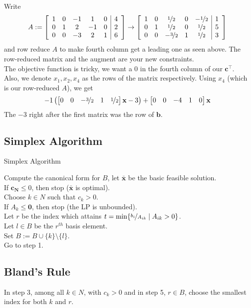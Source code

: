 Write
\[A:=
    \left[\begin{array}{ccccc|c}  
        1 & 0 & -1 & 1 & 0 & 4\\
        0 & 1 & 2 & -1 & 0 & 2\\
        0 & 0 & -3 & 2 & 1 & 6
       \end{array}\right]
    \rightarrow
    \left[\begin{array}{ccccc|c}
        1 & 0 & \nicefrac{1}{2} & 0 & -\nicefrac{1}{2} & 1\\
        0 & 1 & \nicefrac{1}{2} & 0 & \nicefrac{1}{2} & 5\\
        0 & 0 & -\nicefrac{3}{2} & 1 & \nicefrac{1}{2} & 3
    \end{array}\right]
\]
and row reduce $A$ to make fourth column get a leading one as seen above.
The row-reduced matrix and the augment are your new constraints.\\
The objective function is tricky, we want a 0 in the fourth column of our $\mathbf{c}^\top $.
Also, we denote $x_1,x_2,x_4$ as the rows of the matrix respectively.
Using $x_4$ (which is our row-reduced $A$), we get
\[-1\left(
    \begin{bmatrix}
        0 & 0 & -\nicefrac{3}{2} & 1 & \nicefrac{1}{2}
    \end{bmatrix}\mathbf{x}-3\right)+
    \begin{bmatrix}
        0 & 0 & -4 & 1 & 0
    \end{bmatrix}\mathbf{x}
\]
The $-3$ right after the first matrix was the row of $\mathbf{b}$.

\newpage

\subsection{Simplex Algorithm}
\begin{algorithm}
    \caption{Simplex Algorithm}
    Compute the canonical form for $B$, let $\mathbf{\bar{x}}$ be the basic feasible solution.\\
    If $\mathbf{c_N}\le 0$, then stop ($\mathbf{\bar{x}}$ is optimal).\\
    Choose $k\in N$ such that $c_k>0$.\\
    If $A_k\le \mathbf{0}$, then stop (the LP is unbounded).\\
    Let $r$ be the index which attains $t=\min\{\nicefrac{b_i}{A_{ik}}\mid A_{ik}>0\}$.\\
    Let $l\in B$ be the $r^{th}$ basis element.\\
    Set $B:=B\cup\{k\}\setminus\{l\}$.\\
    Go to step 1.
\end{algorithm}

\begin{thmbox}
    \subsection{Bland's Rule}
    In step 3, among all $k\in N$, with $c_k>0$ and in step 5, $r\in B$, 
    choose the smallest index for both $k$ and $r$.
\end{thmbox}

